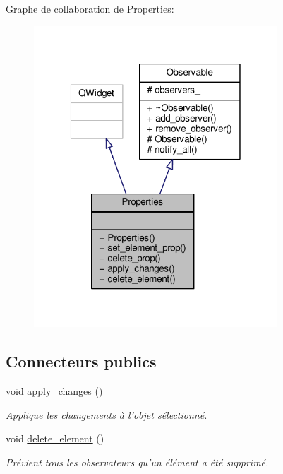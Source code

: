 Graphe de collaboration de Properties\+:
\nopagebreak
\begin{figure}[H]
\begin{center}
\leavevmode
\includegraphics[width=259pt]{dc/d0a/classProperties__coll__graph}
\end{center}
\end{figure}
\subsection*{Connecteurs publics}
\begin{DoxyCompactItemize}
\item 
\hypertarget{classProperties_aa8e9e5c83983a60486d963d2e5b97bf9}{void \hyperlink{classProperties_aa8e9e5c83983a60486d963d2e5b97bf9}{apply\+\_\+changes} ()}\label{classProperties_aa8e9e5c83983a60486d963d2e5b97bf9}

\begin{DoxyCompactList}\small\item\em Applique les changements à l’objet sélectionné. \end{DoxyCompactList}\item 
\hypertarget{classProperties_acb83b3e38f6bbe0cd57d0cf123460253}{void \hyperlink{classProperties_acb83b3e38f6bbe0cd57d0cf123460253}{delete\+\_\+element} ()}\label{classProperties_acb83b3e38f6bbe0cd57d0cf123460253}

\begin{DoxyCompactList}\small\item\em Prévient tous les observateurs qu’un élément a été supprimé. \end{DoxyCompactList}\end{DoxyCompactItemize}
